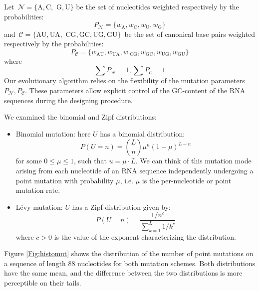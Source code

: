 Let~\(\mathcal{N}= \big \{ \text{A},\text{C},\text{ G}, \text{U} \big \}\) be the set of nucleotides weighted respectively by the probabilities:
\begin{equation*}
P_{\mathcal{N}} = \big \{ w_{\text{A}}, w_{\text{C}}, w_{\text{U}}, w_{\text{G}} \big\}
\end{equation*}
and~\(\mathcal{C} = \big \{ \text{AU}, \text{UA}, \text{ CG}, \text{GC}, \text{UG}, \text{GU}\big \}\)~be the set of canonical base pairs weighted respectively by the probabilities:
\begin{equation*}
P_{\mathcal{C}} = \big \{w_\text{AU}, w_\text{UA}, w_\text{ CG}, w_\text{GC}, w_\text{UG}, w_\text{GU} \big \} 
\end{equation*}
where
\begin{equation*}
\sum P_{\mathcal{N}} = 1, \sum P_{\mathcal{C}}  = 1 
\end{equation*}
Our evolutionary algorithm relies on the flexibility of the mutation parameters $P_{\mathcal{N}}, P_{\mathcal{C}}$. These parameters allow explicit control of the GC-content of the RNA sequences during the designing procedure.

 We examined the binomial and Zipf distributions:

\begin{itemize}
	\item Binomial mutation: here $U$ has a binomial distribution: 
	$$
	P(U=n)= \binom{L}{n} \mu^n (1-\mu)^{L-n}
	$$
	for some $0 \leq \mu \leq 1$, such that $u=\mu \cdot L$. We can think of this mutation mode arising from each nucleotide of an RNA sequence independently undergoing a point mutation with probability $\mu$, i.e. $\mu$ is the per-nucleotide or point mutation rate. 
	
	\item Lévy mutation: $U$ has a Zipf distribution given by: 
	$$
	P(U=n)= \frac{1/n^c}{ \sum_{k=1}^{L}{1/k^c}}
	$$
	where $c>0$ is the value of the exponent characterizing the distribution.
\end{itemize}

Figure \ref{Fig:histomut} shows the distribution of the number of point mutations on a sequence of length $88$ nucleotides for both mutation schemes. Both distributions have the same mean, and the difference between the two distributions is more perceptible on their tails. 

